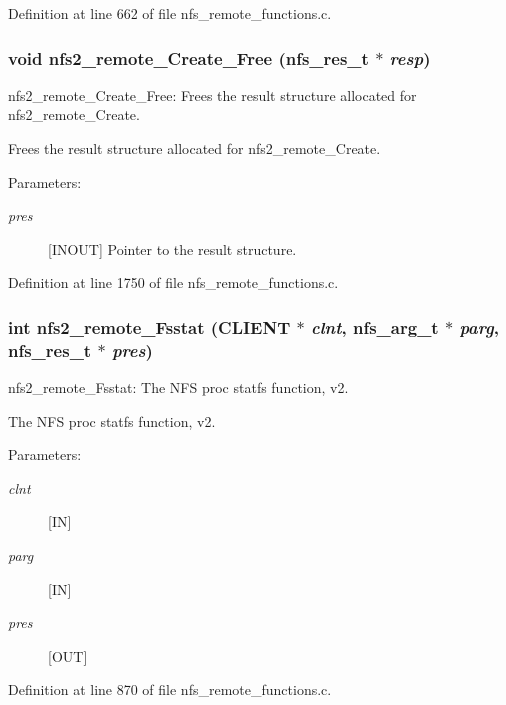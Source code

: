 Definition at line 662 of file nfs\_\-remote\_\-functions.c.
\subsubsection{\setlength{\rightskip}{0pt plus 5cm}void nfs2\_\-remote\_\-Create\_\-Free (nfs\_\-res\_\-t $\ast$ {\em resp})}\label{group__NFSprocs_ga60}


nfs2\_\-remote\_\-Create\_\-Free: Frees the result structure allocated for nfs2\_\-remote\_\-Create.

Frees the result structure allocated for nfs2\_\-remote\_\-Create.

\begin{Desc}
\item[Parameters:]
\begin{description}
\item[{\em pres}][INOUT] Pointer to the result structure. \end{description}
\end{Desc}


Definition at line 1750 of file nfs\_\-remote\_\-functions.c.
\subsubsection{\setlength{\rightskip}{0pt plus 5cm}int nfs2\_\-remote\_\-Fsstat (CLIENT $\ast$ {\em clnt}, nfs\_\-arg\_\-t $\ast$ {\em parg}, nfs\_\-res\_\-t $\ast$ {\em pres})}\label{group__NFSprocs_ga17}


nfs2\_\-remote\_\-Fsstat: The NFS proc statfs function, v2.

The NFS proc statfs function, v2.

\begin{Desc}
\item[Parameters:]
\begin{description}
\item[{\em clnt}][IN] \item[{\em parg}][IN] \item[{\em pres}][OUT] \end{description}
\end{Desc}


Definition at line 870 of file nfs\_\-remote\_\-functions.c.
